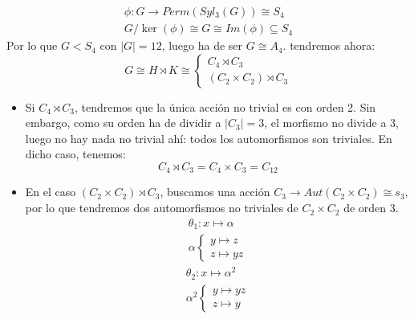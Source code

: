 \begin{itemize}
        \begin{gather*}
            \phi:G\to Perm(Syl_3(G)) \cong S_4 \\
            G/\ker(\phi) \cong G \cong Im(\phi) \subseteq S_4
        \end{gather*}
        Por lo que $G<S_4$ con $|G| = 12$, luego ha de ser $G\cong A_4$. tendremos ahora:
        \begin{equation*}
            G \cong H\rtimes K \cong \left\{\begin{array}{l}
                    C_4\rtimes C_3 \\
                    (C_2\times C_2) \rtimes C_3
            \end{array}\right.
        \end{equation*}
        \begin{itemize}
            \item Si $C_4\rtimes C_3$, tendremos que la única acción no trivial es
                con orden 2. Sin embargo, como su orden ha de dividir a $|C_3| = 3$, el morfismo no divide a 3, luego no hay nada no trivial ahí: todos los automorfismos son triviales. En dicho caso, tenemos:
                \begin{equation*}
                    C_4\rtimes C_3 = C_4\times C_3 = C_{12}
                \end{equation*}
            \item En el caso $(C_2\times C_2)\rtimes C_3$, buscamos una acción $C_3\to Aut(C_2\times C_2)\cong s_3$, por lo que tendremos dos automorfismos no triviales de $C_2\times C_2$ de orden 3.
                \begin{gather*}
                    \theta_1 : x \longmapsto \alpha \\
                    \alpha \left\{\begin{array}{l}
                            y \longmapsto z \\
                            z \longmapsto yz
                    \end{array}\right.
                \end{gather*}
                \begin{gather*}
                    \theta_2 : x \longmapsto \alpha^2 \\
                    \alpha^2\left\{\begin{array}{l}
                            y\longmapsto yz \\
                            z \longmapsto y

\end{array}
\end{gather*}
\end{itemize}
\end{itemize}

